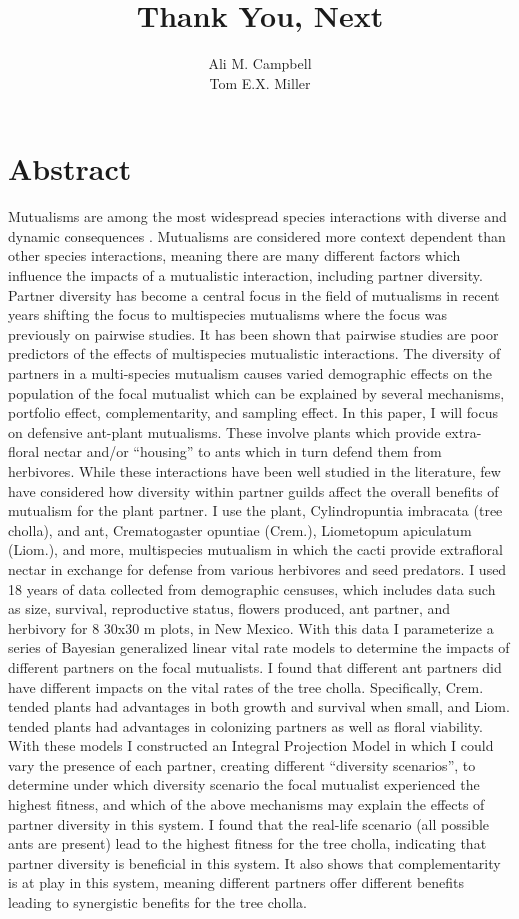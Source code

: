 \documentclass[12pt,a4paper]{article}
\title{Thank You, Next}
\author{Ali M. Campbell\\
	Tom E.X. Miller}
\begin{document}
	\maketitle
	
\section*{Abstract}

Mutualisms are among the most widespread species interactions with diverse and dynamic consequences . Mutualisms are considered more context dependent than other species interactions, meaning there are many different factors which influence the impacts of a mutualistic interaction, including partner diversity. Partner diversity has become a central focus in the field of mutualisms in recent years shifting the focus to multispecies mutualisms where the focus was previously on pairwise studies. It has been shown that pairwise studies are poor predictors of the effects of multispecies mutualistic interactions. The diversity of partners in a multi-species mutualism causes varied demographic effects on the population of the focal mutualist which can be explained by several mechanisms, portfolio effect, complementarity, and sampling effect. In this paper, I will focus on defensive ant-plant mutualisms. These involve plants which provide extra-floral nectar and/or “housing” to ants which in turn defend them from herbivores. While these interactions have been well studied in the literature, few have considered how diversity within partner guilds affect the overall benefits of mutualism for the plant partner. 
I use the plant, Cylindropuntia imbracata (tree cholla), and ant, Crematogaster opuntiae (Crem.), Liometopum apiculatum (Liom.), and more, multispecies mutualism in which the cacti provide extrafloral nectar in exchange for defense from various herbivores and seed predators. I used 18 years of data collected from demographic censuses, which includes data such as size, survival, reproductive status, flowers produced, ant partner, and herbivory for 8 30x30 m plots, in New Mexico. With this data I parameterize a series of Bayesian generalized linear vital rate models to determine the impacts of different partners on the focal mutualists. I found that different ant partners did have different impacts on the vital rates of the tree cholla. Specifically, Crem. tended plants had advantages in both growth and survival when small, and Liom. tended plants had advantages in colonizing partners as well as floral viability. With these models I constructed an Integral Projection Model in which I could vary the presence of each partner, creating different “diversity scenarios”, to determine under which diversity scenario the focal mutualist experienced the highest fitness, and which of the above mechanisms may explain the effects of partner diversity in this system. I found that the real-life scenario (all possible ants are present) lead to the highest fitness for the tree cholla, indicating that partner diversity is beneficial in this system. It also shows that complementarity is at play in this system, meaning different partners offer different benefits leading to synergistic benefits for the tree cholla. 
\end{document}
